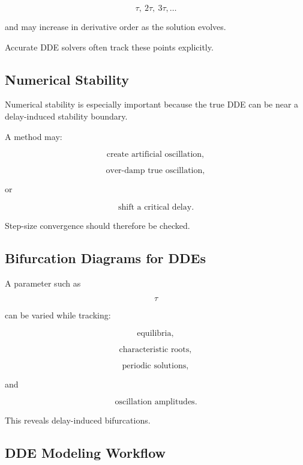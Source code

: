 \[
\boxed{
\tau,
\ 2\tau,
\ 3\tau,\ldots
}
\]

and may increase in derivative order as the solution evolves.

Accurate DDE solvers often track these points explicitly.

\subsection{Numerical Stability}
\label{subsec:dde-numerical-stability}

Numerical stability is especially important because the true DDE can be
near a delay-induced stability boundary.

A method may:

\[
\boxed{
\text{create artificial oscillation},
}
\]

\[
\boxed{
\text{over-damp true oscillation},
}
\]

or

\[
\boxed{
\text{shift a critical delay}.
}
\]

Step-size convergence should therefore be checked.

\subsection{Bifurcation Diagrams for DDEs}
\label{subsec:dde-bifurcation-diagrams}

A parameter such as

\[
\boxed{
\tau
}
\]

can be varied while tracking:

\[
\boxed{
\text{equilibria},
}
\]

\[
\boxed{
\text{characteristic roots},
}
\]

\[
\boxed{
\text{periodic solutions},
}
\]

and

\[
\boxed{
\text{oscillation amplitudes}.
}
\]

This reveals delay-induced bifurcations.

\subsection{DDE Modeling Workflow}
\label{subsec:dde-modeling-workflow}

